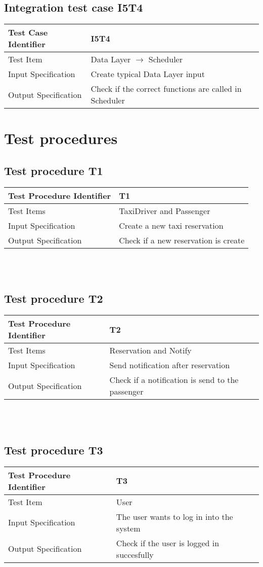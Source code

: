 \documentclass[12pt, oneside]{book}   	%
\begin{document}
\subsection{Integration test case I5T4}
\begin{tabular}{|l|l|}
\hline
Test Case Identifier & I5T4\\
\hline
Test Item & Data Layer $\rightarrow$ Scheduler\\
\hline
Input Specification & Create typical Data Layer input\\
\hline
Output Specification & Check if the correct functions are called in Scheduler\\
\hline
\end{tabular}
\clearpage
\section{Test procedures}
\subsection {Test procedure T1}
\begin{tabular}{|l|l|}
\hline
Test Procedure Identifier & T1 \\
\hline
Test Items & TaxiDriver and Passenger \\
\hline
Input Specification & Create a new taxi reservation \\
\hline
Output Specification & Check if a new reservation is create \\
\hline
\end{tabular}
\\
\\
\subsection {Test procedure T2}
\begin{tabular}{|l|l|}
\hline
Test Procedure Identifier & T2 \\
\hline
Test Items & Reservation and Notify \\
\hline
Input Specification & Send notification after reservation \\
\hline
Output Specification & Check if a notification is send to the passenger \\
\hline
\end{tabular}
\\
\\
\subsection {Test procedure T3}
\begin{tabular}{|l|l|}
\hline
Test Procedure Identifier & T3 \\
\hline
Test Item & User \\
\hline
Input Specification & The user wants to log in into the system  \\
\hline
Output Specification & Check if the user is logged in succesfully\\
\hline
\end{tabular}
\\
\\
\end{document}
